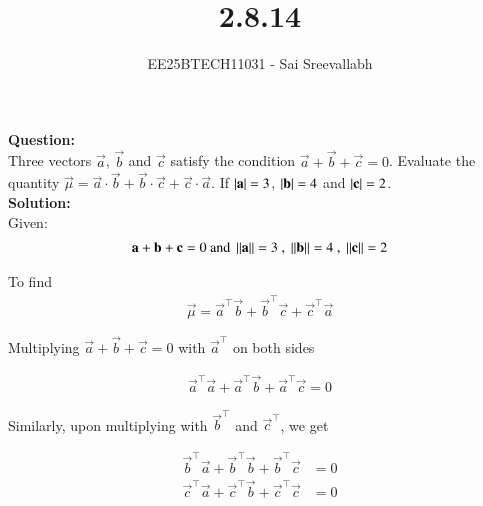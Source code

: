 \documentclass[journal]{IEEEtran}
\begin{document}

\vspace{3cm}

\title{2.8.14}
\author {EE25BTECH11031 - Sai Sreevallabh}
{\let\newpage\relax\maketitle}

\renewcommand{\thefigure}{\theenumi}
\renewcommand{\thetable}{\theenumi}
\setlength{\intextsep}{10pt} %


\renewcommand{\thetable}{\theenumi}

\textbf{Question: }\\

Three vectors $\vec{a}$, $\vec{b}$ and $\vec{c}$ satisfy the condition $\vec{a}+\vec{b}+\vec{c}=0$. Evaluate the quantity $\vec{\mu} = \vec{a}\cdot\vec{b} + \vec{b}\cdot\vec{c} + \vec{c}\cdot\vec{a}$. If $\left\vert\mathbf{a}\right\vert = 3$, $\left\vert\mathbf{b}\right\vert=4$ and $\left\vert\mathbf{c}\right\vert=2$. \\

\textbf{Solution: }\\

Given: 
\begin{align}
    \vec{a}+\vec{b}+\vec{c}=0 \ \text{and}\ \norm{\vec{a}}=3 \ , \ \norm{\vec{b}}=4 \ , \ \norm{\vec{c}}=2
\end{align}

To find
\begin{align}
    \vec{\mu} = \vec{a}^\top\vec{b}+\vec{b}^\top\vec{c}+\vec{c}^\top\vec{a}
\end{align}

Multiplying $\vec{a}+\vec{b} + \vec{c}=0$ with $\vec{a}^\top$ on both sides

\begin{align}
    \vec{a}^\top\vec{a} + \vec{a}^\top\vec{b} + \vec{a}^\top\vec{c} = 0
\end{align}

Similarly, upon multiplying with $\vec{b}^\top$ and $\vec{c}^\top$, we get 

\begin{align}
   \vec{b}^\top\vec{a} + \vec{b}^\top\vec{b} + \vec{b}^\top\vec{c} &= 0\\
   \vec{c}^\top\vec{a} + \vec{c}^\top\vec{b} + \vec{c}^\top\vec{c} &= 0
\end{align}
\end{document}
